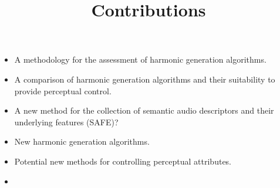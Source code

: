 \documentclass[a4paper]{article}
\title{Contributions}
\author{}
\date{}
\begin{document}
\maketitle

	\begin{itemize}
		\item A methodology for the assessment of harmonic generation algorithms.
		\item A comparison of harmonic generation algorithms and their suitability to provide perceptual control.
		\item A new method for the collection of semantic audio descriptors and their underlying features (SAFE)?
		\item New harmonic generation algorithms.
		\item Potential new methods for controlling perceptual attributes.
		\item 
	\end{itemize}
\end{document}

